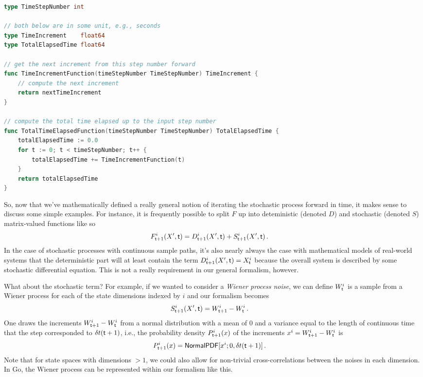 \documentclass{book}
\begin{document}
\begin{lstlisting}[language=Go]
type TimeStepNumber int

// both below are in some unit, e.g., seconds
type TimeIncrement    float64
type TotalElapsedTime float64

// get the next increment from this step number forward
func TimeIncrementFunction(timeStepNumber TimeStepNumber) TimeIncrement {
    // compute the next increment
    return nextTimeIncrement
}

// compute the total time elapsed up to the input step number
func TotalTimeElapsedFunction(timeStepNumber TimeStepNumber) TotalElapsedTime {
    totalElapsedTime := 0.0
    for t := 0; t < timeStepNumber; t++ {
        totalElapsedTime += TimeIncrementFunction(t)
    }
    return totalElapsedTime
}
\end{lstlisting}

So, now that we've mathematically defined a really general notion of iterating the stochastic process forward in time, it makes sense to discuss some simple examples. For instance, it is frequently possible to split $F$ up into deteministic (denoted $D$) and stochastic (denoted $S$) matrix-valued functions like so
\begin{align}
& F^{i}_{{\sf t}+1}(X',{\sf t}) = D^{i}_{{\sf t}+1}(X',{\sf t}) + S^{i}_{{\sf t}+1}(X',{\sf t}) \,.
\end{align}
In the case of stochastic processes with continuous sample paths, it's also nearly always the case with mathematical models of real-world systems that the deterministic part will at least contain the term $D^{i}_{{\sf t}+1}(X',{\sf t}) = X^i_{\sf t}$ because the overall system is described by some stochastic differential equation. This is not a really requirement in our general formalism, however.

What about the stochastic term? For example, if we wanted to consider a \emph{Wiener process noise}, we can define $W^i_{{\sf t}}$ is a sample from a Wiener process for each of the state dimensions indexed by $i$ and our formalism becomes
\begin{align}
& S^{i}_{{\sf t}+1}(X',{\sf t}) = W^i_{{\sf t}+1}-W^i_{\sf t} \label{eq:wiener}\,.
\end{align}
One draws the increments $W^i_{{\sf t}+1}-W^i_{\sf t}$ from a normal distribution with a mean of $0$ and a variance equal to the length of continuous time that the step corresponded to $\delta t({\sf t}+1)$, i.e., the probability density $P^i_{{\sf t}+1}(x)$ of the increments $x^i=W^i_{{\sf t}+1}-W^i_{\sf t}$ is
\begin{align}
P^i_{{\sf t}+1}(x) &= {\sf NormalPDF}[x^i;0,\delta t({\sf t}+1)] \,.
\end{align}
Note that for state spaces with dimensions $>1$, we could also allow for non-trivial cross-correlations between the noises in each dimension. In Go, the Wiener process can be represented within our formalism like this.
\end{document}
